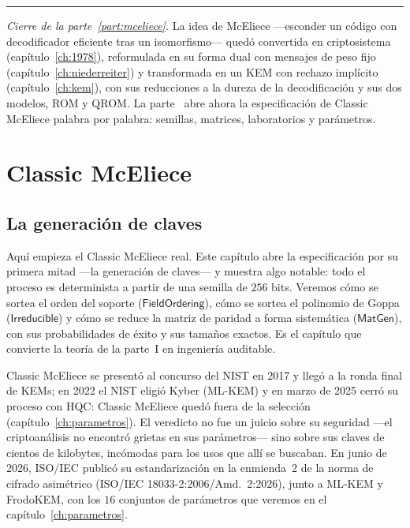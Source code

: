 \documentclass[11pt,a4paper,oneside]{report}
\begin{document}
\begin{center}\rule{0.55\textwidth}{0.4pt}\end{center}
\medskip
\noindent\textit{Cierre de la parte~\ref{part:mceliece}.} La idea de
McEliece ---esconder un código con decodificador eficiente tras un
isomorfismo--- quedó convertida en criptosistema
(capítulo~\ref{ch:1978}), reformulada en su forma dual con mensajes
de peso fijo (capítulo~\ref{ch:niederreiter}) y transformada en un
KEM con rechazo implícito (capítulo~\ref{ch:kem}), con sus
reducciones a la dureza de la decodificación y sus dos modelos, ROM y
QROM. La parte~\ref{part:classic} abre ahora la especificación de
Classic McEliece palabra por palabra: semillas, matrices,
laboratorios y parámetros.


\part{Classic McEliece}\label{part:classic}

\chapter{La generación de claves}\label{ch:keygen}

\begin{roadmap}
Aquí empieza el Classic McEliece real. Este capítulo abre la
especificación por su primera mitad ---la generación de claves--- y
muestra algo notable: todo el proceso es determinista a partir de una
semilla de $256$ bits. Veremos cómo se sortea el orden del soporte
($\textsf{FieldOrdering}$), cómo se sortea el polinomio de Goppa
($\textsf{Irreducible}$) y cómo se reduce la matriz de paridad a forma
sistemática ($\textsf{MatGen}$), con sus probabilidades de éxito y sus
tamaños exactos. Es el capítulo que convierte la teoría de la parte~I
en ingeniería auditable.
\end{roadmap}

\begin{historia}
Classic McEliece se presentó al concurso del NIST en 2017 y llegó a la
ronda final de KEMs; en 2022 el NIST eligió Kyber (ML-KEM) y en marzo
de 2025 cerró su proceso con HQC: Classic McEliece quedó fuera de la
selección (capítulo~\ref{ch:parametros}). El veredicto no fue un juicio
sobre su seguridad ---el criptoanálisis no encontró grietas en sus
parámetros--- sino sobre sus claves de cientos de kilobytes, incómodas
para los usos que allí se buscaban. En junio de 2026, ISO/IEC publicó
su estandarización en la enmienda~2 de la norma de cifrado asimétrico
(ISO/IEC 18033-2:2006/Amd.~2:2026), junto a ML-KEM y FrodoKEM, con los
$16$ conjuntos de parámetros que veremos en el
capítulo~\ref{ch:parametros}.
\end{historia}
\end{document}
